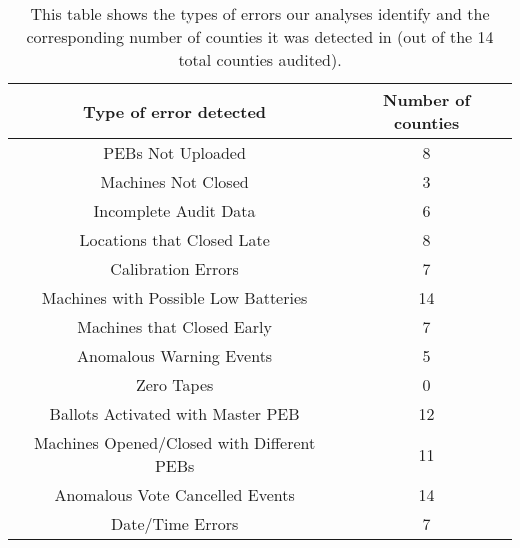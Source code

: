 \begin{table*}
	\begin{center}
	\begin{tabular}{| c | c |}
	\hline
	Type of error detected &Number of counties\\
	\hline
	PEBs Not Uploaded &8\\ %
	\hline
	Machines Not Closed &3\\ %
	\hline
	Incomplete Audit Data &6\\ %
	\hline
	Locations that Closed Late &8\\ %
	\hline
	Calibration Errors &7\\ %
	\hline
	Machines with Possible Low Batteries &14\\ %
	\hline
	Machines that Closed Early &7\\ %
	\hline
	Anomalous Warning Events &5\\ %
	\hline
	Zero Tapes &0\\
	\hline
	Ballots Activated with Master PEB &12\\ %
	\hline
	Machines Opened/Closed with Different PEBs &11\\ %
	\hline
	Anomalous Vote Cancelled Events &14\\ %
	\hline
	Date/Time Errors &7\\ %
	\hline
	\end{tabular}
	\end{center}
	\caption{This table shows the types of errors our analyses identify and the corresponding number of counties it was detected in (out of the 14 total counties audited).}
\end{table*}






